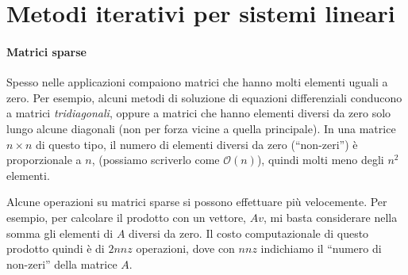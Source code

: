 \documentclass[a4paper]{report}
\theoremstyle{definiton}
\theoremstyle{remark}
\begin{document}



\section{Metodi iterativi per sistemi lineari}

\paragraph{Matrici sparse} Spesso nelle applicazioni compaiono matrici che hanno molti elementi uguali a zero. Per esempio, alcuni metodi di soluzione di equazioni differenziali conducono a matrici \emph{tridiagonali}, oppure a matrici che hanno elementi diversi da zero solo lungo alcune diagonali (non per forza vicine a quella principale). In una matrice $n\times n$ di questo tipo, il numero di elementi diversi da zero (``non-zeri'') è proporzionale a $n$, (possiamo scriverlo come $\mathcal{O}(n)$), quindi molti meno degli $n^2$ elementi.

Alcune operazioni su matrici sparse si possono effettuare più velocemente. Per esempio, per calcolare il prodotto con un vettore, $Av$, mi basta considerare nella somma gli elementi di $A$ diversi da zero. Il costo computazionale di questo prodotto quindi è di $2nnz$ operazioni, dove con $nnz$ indichiamo il ``numero di non-zeri'' della matrice $A$.
\end{document}

